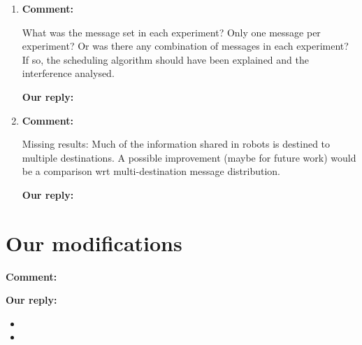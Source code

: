 \documentclass{article}
\begin{document}
\begin{enumerate}
\item \begin{flushleft}
    \textbf{Comment:}
  \end{flushleft}
  What was the message set in each experiment? Only one message per experiment? Or was there any combination of messages in each experiment? If so, the scheduling algorithm should have been explained and the interference analysed.

  \begin{flushleft}
    \textbf{Our reply:}
  \end{flushleft}


\item \begin{flushleft}
    \textbf{Comment:}
  \end{flushleft}
  Missing results: Much of the information shared in robots is destined to multiple destinations. A possible improvement (maybe for future work) would be a comparison wrt multi-destination message distribution.

  \begin{flushleft}
    \textbf{Our reply:}
  \end{flushleft}

\end{enumerate}

\newpage


\section{Our modifications}

\begin{flushleft}
  \textbf{Comment:}
\end{flushleft}

\begin{flushleft}
  \textbf{Our reply:}
\end{flushleft}

\begin{itemize}
\item 
\item
\end{itemize}
\end{document}

